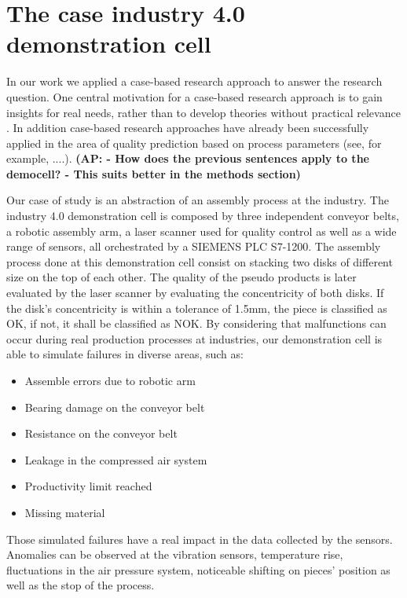 \documentclass[5p,times,procedia]{elsarticle}
\newcommand{\AP}[1]{{\color{blue} {\bf (AP: #1)}}}
\begin{document}
\section{The case industry 4.0 demonstration cell} %

In our work we applied a case-based research approach \cite{yin2017case} to answer the research question. 
One central motivation for a case-based research approach is to gain insights for real needs, rather than to develop theories without practical relevance \cite{cutcheon1993case}. %
In addition case-based research approaches have already been successfully applied in the area of quality prediction based on process parameters (see, for example, ....). %
\AP{ 
       - How does the previous sentences apply to the democell?
       - This suits better in the methods section}

Our case of study is an abstraction of an assembly process at the industry. The industry 4.0 demonstration cell is composed by three independent conveyor belts, a robotic assembly arm, a laser scanner used for quality control as well as a wide range of sensors, all orchestrated by a SIEMENS PLC S7-1200. 
The assembly process done at this demonstration cell consist on stacking two disks of different size on the top of each other. The quality of the pseudo products is later evaluated by the laser scanner by evaluating the concentricity of both disks. If the disk's concentricity is within a tolerance of 1.5mm, the piece is classified as OK, if not, it shall be classified as NOK.
By considering that malfunctions can occur during real production processes at industries, our demonstration cell is able to simulate failures in diverse areas, such as:

\begin{itemize}
       \item Assemble errors due to robotic arm
       \item Bearing damage on the conveyor belt
       \item Resistance on the conveyor belt
       \item Leakage in the compressed air system
       \item Productivity limit reached
       \item Missing material
\end{itemize}

Those simulated failures have a real impact in the data collected by the sensors. Anomalies can be observed at the vibration sensors, temperature rise, fluctuations in the air pressure system, noticeable shifting on pieces' position as well as the stop of the process.
\end{document}
